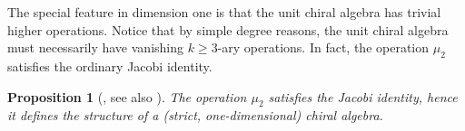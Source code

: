 \documentclass[11pt]{amsart}
\newtheorem{prop}[thm]{Proposition}
\theoremstyle{definition}
\theoremstyle{remark}
\numberwithin{equation}{section}
\begin{document}
The special feature in dimension one is that the unit chiral algebra has trivial higher operations.
Notice that by simple degree reasons, the unit chiral algebra must necessarily have vanishing $k \geq 3$-ary
operations.
In fact, the operation $\mu_2$ satisfies the ordinary Jacobi identity.

\begin{prop}[\cite{BD}, see also \cite{HLdmodule}]
The operation $\mu_2$ satisfies the Jacobi identity, hence it defines the structure of a (strict, one-dimensional) chiral
algebra.
\end{prop}
%
%
\end{document}
